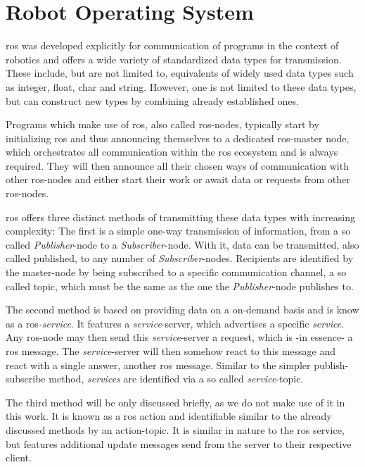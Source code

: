 \section{Robot Operating System}
\label{intro:ros}
\gls{ros} was developed explicitly for communication of programs in the context of robotics and offers a wide variety of standardized data types for transmission.
These include, but are not limited to, equivalents of widely used data types such as integer, float, char and string.
However, one is not limited to these data types, but can construct new types by combining already established ones.

Programs which make use of \gls{ros}, also called \gls{ros}-nodes, typically start by initializing \gls{ros} and thus announcing themselves to a dedicated \gls{ros}-master node, which orchestrates all communication within the \gls{ros} ecosystem and is always required.
They will then announce all their chosen ways of communication with other \gls{ros}-nodes and either start their work or await data or requests from other \gls{ros}-nodes.

\gls{ros} offers three distinct methods of transmitting these data types with increasing complexity:
The first is a simple one-way transmission of information, from a so called \textit{Publisher}-node to a \textit{Subscriber}-node.
With it, data can be transmitted, also called published, to any number of \textit{Subscriber}-nodes.
Recipients are identified by the master-node by being subscribed to a specific communication channel, a so called topic, which must be the same as the one the \textit{Publisher}-node publishes to.

The second method is based on providing data on a on-demand basis and is know as a \gls{ros}\textit{-service}.
It features a \textit{service}-server, which advertises a specific \textit{service}.
Any \gls{ros}-node may then send this \textit{service}-server a request, which is -in essence- a \gls{ros} message.
The \textit{service}-server will then somehow react to this message and react with a single answer, another \gls{ros} message.
Similar to the simpler publish-subscribe method, \textit{services} are identified via a so called \textit{service}-topic.

The third method will be only discussed briefly, as we do not make use of it in this work.
It is known as a \gls{ros} action and identifiable similar to the already discussed methods by an action-topic.
It is similar in nature to the \gls{ros} service, but features additional update messages send from the server to their respective client.


